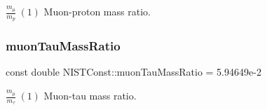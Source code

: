 $\frac{m_\mu}{m_p} \ (1)$ Muon-\/proton mass ratio. \mbox{\label{group___muon_gaaf24aa0c43f6d4a1935963fdd4c44789}} 
\subsubsection{\texorpdfstring{muon\+Tau\+Mass\+Ratio}{muonTauMassRatio}}
{\footnotesize\ttfamily const double N\+I\+S\+T\+Const\+::muon\+Tau\+Mass\+Ratio = 5.\+94649e-\/2}

$\frac{m_\mu}{m_\tau} \ (1)$ Muon-\/tau mass ratio. 